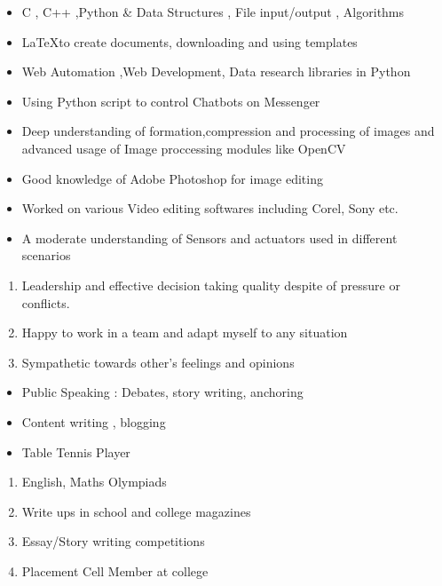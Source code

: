 \documentclass{article}
\begin{document}
	
			\begin{itemize}
			\color{black}	\item C , C++ ,Python \& Data Structures , File input/output , Algorithms
			\color{black}	\item  \LaTeX to create documents, downloading and using templates
			\color{black} \item Web Automation ,Web Development, Data research libraries in Python
			\color{black} \item Using Python script to control  Chatbots on Messenger
			\color{black} \item Deep understanding of formation,compression and processing of images and advanced usage of Image proccessing modules like OpenCV
			\color{black} \item Good knowledge of Adobe Photoshop for image editing
			\color{black} \item Worked on various Video editing softwares including Corel, Sony etc.
			\color{black} \item A moderate understanding of Sensors and actuators used in different scenarios
			
		\end{itemize}
	\begin{enumerate}
		\LARGE
			\color{black}	\item Leadership and effective decision taking quality despite of pressure or conflicts.
		\item  Happy to work in a team and adapt myself to any situation
		\item Sympathetic towards other's feelings and opinions
	\end{enumerate}
\begin{itemize}
	\LARGE
	\color{black}	\item Public Speaking : Debates, story writing, anchoring
	\item Content writing , blogging
	\item Table Tennis Player
\end{itemize}
\begin{enumerate}
	\LARGE
	\color{black}	\item English, Maths Olympiads
	\item Write ups in school and college magazines
	\item Essay/Story writing competitions
	\item Placement Cell Member at college 
	
\end{enumerate}		
\end{document}
